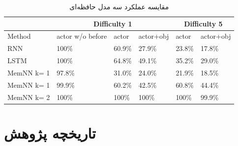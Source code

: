 \documentclass[12pt, a4paper, oneside]{report}
\begin{document}
\begin{table}[!ht]
    \begin{small}
    \begin{center}
      \begin{latin}
      \begin{tabular}{|l||l|l|l||l|l|}
        \hline
         & \multicolumn{3}{c|}{Difficulty 1} & \multicolumn{2}{c|}{Difficulty 5} \\
        \hline
        Method & actor w/o before & actor & actor+obj & actor & actor+obj \\
        \hline
        RNN & 100\% & 60.9\% & 27.9\% & 23.8\% & 17.8\% \\
        LSTM & 100\% & 64.8\% & 49.1\% & 35.2\% & 29.0\% \\
        \hline
        MemNN k= 1 & 97.8\% & 31.0\% & 24.0\% & 21.9\% & 18.5\% \\
        MemNN k= 1 & 99.9\% & 60.2\% & 42.5\% & 60.8\% & 44.4\% \\
        MemNN k= 2 & 100\% & 100\% & 100\% & 100\% & 99.9\% \\
        \hline
      \end{tabular}
      \end{latin}
      \caption{مقایسه عملکرد سه مدل حافظه‌ای}
      \label{tab:MemNN-vs-others}
    \end{center}
    \end{small}
\end{table}


\chapter{تاریخچه پژوهش}
\pagebreak
\end{document}
